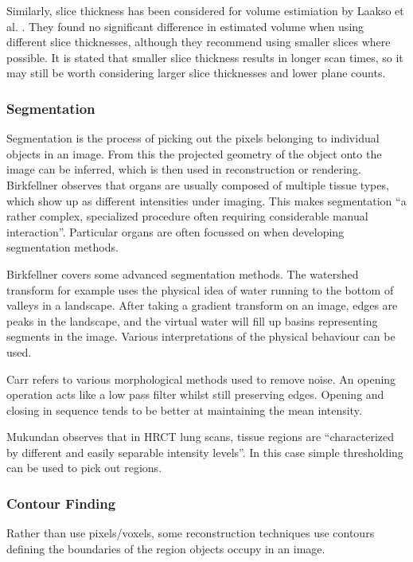 \documentclass[11p, titlepage]{article}
\begin{document}
Similarly, slice thickness has been considered for volume estimiation by Laakso et al. \cite{laakso1997mri}. They found no significant difference in estimated volume when using different slice thicknesses, although they recommend using smaller slices where possible. It is stated that smaller slice thickness results in longer scan times, so it may still be worth considering larger slice thicknesses and lower plane counts.

\subsubsection{Segmentation}

Segmentation is the process of picking out the pixels belonging to individual objects in an image. From this the projected geometry of the object onto the image can be inferred, which is then used in reconstruction or rendering. Birkfellner \cite{birkfellner2016applied} observes that organs are usually composed of multiple tissue types, which show up as different intensities under imaging. This makes segmentation ``a rather complex, specialized procedure often requiring considerable manual interaction''. Particular organs are often focussed on when developing segmentation methods.

Birkfellner \cite{birkfellner2016applied} covers some advanced segmentation methods. The watershed transform for example uses the physical idea of water running to the bottom of valleys in a landscape. After taking a gradient transform on an image, edges are peaks in the landscape, and the virtual water will fill up basins representing segments in the image. Various interpretations of the physical behaviour can be used.

Carr \cite{carr1996surface} refers to various morphological methods used to remove noise. An opening operation acts like a low pass filter whilst still preserving edges. Opening and closing in sequence tends to be better at maintaining the mean intensity.

Mukundan \cite{mukundan2016reconstruction} observes that in HRCT lung scans, tissue regions are ``characterized by different and easily separable intensity levels''. In this case simple thresholding can be used to pick out regions. 

\subsubsection{Contour Finding}

Rather than use pixels/voxels, some reconstruction techniques use contours defining the boundaries of the region objects occupy in an image. 
\end{document}
